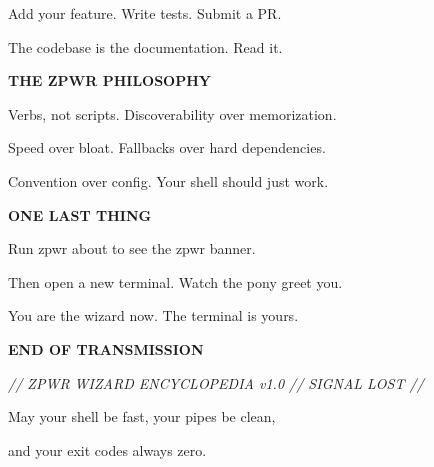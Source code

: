 \documentclass[11pt,a4paper,twoside]{book}
\begin{document}
Add your feature. Write tests. Submit a PR.

The codebase is the documentation. Read it.


\vspace{12pt}
{\bfseries\color{neonyellow} THE ZPWR PHILOSOPHY}\vspace{4pt}

Verbs, not scripts.  Discoverability over memorization.

Speed over bloat.    Fallbacks over hard dependencies.

Convention over config.  Your shell should just work.


\vspace{12pt}
{\bfseries\color{neonyellow} ONE LAST THING}\vspace{4pt}

Run zpwr about to see the zpwr banner.

Then open a new terminal. Watch the pony greet you.

You are the wizard now. The terminal is yours.


\vspace{10pt}
{\large\bfseries\color{neoncyan} END OF TRANSMISSION}\vspace{6pt}

{\small\itshape\color{dimtext} // ZPWR WIZARD ENCYCLOPEDIA v1.0 // SIGNAL LOST //}

May your shell be fast, your pipes be clean,

and your exit codes always zero.


\vspace{16pt}
\end{document}
